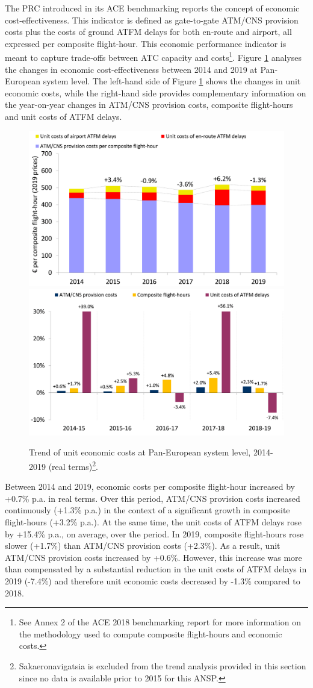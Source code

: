 \documentclass[
]{book}
\begin{document}
The PRC introduced in its ACE benchmarking reports the concept of economic cost-effectiveness. This indicator is defined as gate-to-gate ATM/CNS provision costs plus the costs of ground ATFM delays for both en‐route and airport, all expressed per composite flight-hour. This economic performance indicator is meant to capture trade‐offs between ATC capacity and costs\footnote{See Annex 2 of the ACE 2018 benchmarking report for more information on the methodology used to compute composite flight-hours and economic costs.}. Figure \ref{fig:figure9} analyses the changes in economic cost-effectiveness between 2014 and 2019 at Pan-European system level. The left-hand side of Figure \ref{fig:figure9} shows the changes in unit economic costs, while the right-hand side provides complementary information on the year-on-year changes in ATM/CNS provision costs, composite flight-hours and unit costs of ATFM delays.



\begin{figure}

{\centering \includegraphics[width=0.5\linewidth]{figures/Figure 3-1-Left} \includegraphics[width=0.5\linewidth]{figures/Figure 3-1-Right} 

}

\caption{Trend of unit economic costs at Pan-European system level, 2014-2019 (real terms)\footnote{Sakaeronavigatsia is excluded from the trend analysis provided in this section since no data is available prior to 2015 for this ANSP.}.}\label{fig:figure9}
\end{figure}

Between 2014 and 2019, economic costs per composite flight-hour increased by +0.7\% p.a. in real terms. Over this period, ATM/CNS provision costs increased continuously (+1.3\% p.a.) in the context of a significant growth in composite flight-hours (+3.2\% p.a.). At the same time, the unit costs of ATFM delays rose by +15.4\% p.a., on average, over the period. In 2019, composite flight-hours rose slower (+1.7\%) than ATM/CNS provision costs (+2.3\%). As a result, unit ATM/CNS provision costs increased by +0.6\%. However, this increase was more than compensated by a substantial reduction in the unit costs of ATFM delays in 2019 (-7.4\%) and therefore unit economic costs decreased by -1.3\% compared to 2018.
\end{document}
